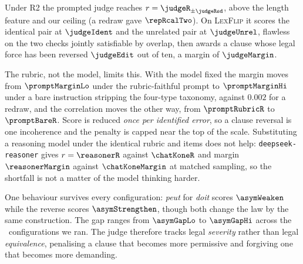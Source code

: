 \documentclass{BVP_JCLLT}
\begin{document}
Under R2 the prompted judge reaches $r=\judgeR_{\pm\judgeRsd}$, above the length
feature and our ceiling (a redraw gave $\repRcalTwo$). On \textsc{LexFlip} it
scores the identical pair at $\judgeIdent$ and the unrelated pair at
$\judgeUnrel$, flawless on the two checks jointly satisfiable by overlap, then
awards a clause whose legal force has been reversed $\judgeEdit$ out of ten, a
margin of $\judgeMargin$.

The rubric, not the model, limits this. With the model fixed the margin moves
from $\promptMarginLo$ under the rubric-faithful prompt to $\promptMarginHi$
under a bare instruction stripping the four-type taxonomy, against $0.002$ for a
redraw, and the correlation moves the other way, from $\promptRubricR$ to
$\promptBareR$. Score is reduced \emph{once per identified error}, so a clause
reversal is one incoherence and the penalty is capped near the top of the scale.
Substituting a reasoning model under the identical rubric and items does not
help: \texttt{deepseek-reasoner} gives $r=\reasonerR$ against $\chatKoneR$ and
margin $\reasonerMargin$ against $\chatKoneMargin$ at matched sampling, so the
shortfall is not a matter of the model thinking harder.

One behaviour survives every configuration: \emph{peut} for \emph{doit} scores
$\asymWeaken$ while the reverse scores $\asymStrengthen$, though both change the
law by the same construction. The gap ranges from $\asymGapLo$ to $\asymGapHi$
across the \nConfigs\ configurations we ran. The judge therefore tracks legal
\emph{severity} rather than legal \emph{equivalence}, penalising a clause that
becomes more permissive and forgiving one that becomes more demanding.
\end{document}
